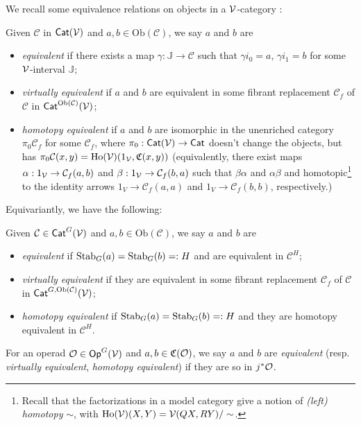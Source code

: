 \documentclass[psamsfonts,oneside,10pt,letterpaper
,draft
]{amsart}%
\renewcommand{\C}{\ensuremath{\mathfrak{C}}}
\newcommand{\J}{\ensuremath{\mathbb{J}}}
\renewcommand{\1}{\ensuremath{\mathbb{id}}}
\DeclareMathOperator{\Ho}{Ho}
\begin{document}
We recall some equivalence relations on objects in a $\mathcal V$-category \cite{Cav14, BM13}:
\begin{definition}
      Given $\mathcal{C}$ in  $\mathsf{Cat}(\mathcal V)$ and $a,b\in\mathrm{Ob}(\mathcal C)$, we say $a$ and $b$ are
      \begin{itemize}
      \item {\em equivalent} if there exists a map $\gamma: \J \to \mathcal C$ such that
            $\gamma i_0 = a$, $\gamma i_1 = b$
            for some $\mathcal V$-interval $\J$;
      \item {\em virtually equivalent} if $a$ and $b$ are equivalent in some fibrant replacement
            $\mathcal C_f$ of $\mathcal C$ in $\mathsf{Cat}^{\mathrm{Ob}(\mathcal C)}(\mathcal V)$;
      \item {\em homotopy equivalent} if $a$ and $b$ are isomorphic in the unenriched category $\pi_0 \mathcal C_f$
            for some $\mathcal C_f$,
            where $\pi_0: \mathsf{Cat}(\mathcal V) \to \mathsf{Cat}$ doesn't change the objects, but has $\pi_0\mathcal C(x,y) = \Ho(\V)(1_\V,\C(x,y))$
            (equivalently, there exist maps
            $\alpha: 1_{\mathcal V} \to \mathcal C_f(a,b)$ and $\beta: 1_{\mathcal V}\to \mathcal C_f(b,a)$ such that
            $\beta\alpha$ and $\alpha\beta$ and homotopic\footnote{
              Recall that the factorizations in a model category give a notion of \textit{(left) homotopy} $\sim$,
              with $\Ho(\V)(X,Y) = \V(QX,RY)/\sim$.}
            to the identity arrows
            $1_V\to \mathcal C_f(a,a)$ and $1_V \to \mathcal C_f(b,b)$, respectively.)
      \end{itemize}
\end{definition}

Equivariantly, we have the following:
\begin{definition}
      Given $\mathcal{C}\in \mathsf{Cat}^G(\mathcal V)$ and $a,b\in \mathrm{Ob}(\mathcal{C})$, we say $a$ and $b$ are
      \begin{itemize}
      \item {\em equivalent} if $\mathrm{Stab}_G(a) = \mathrm{Stab}_G(b) =: H$ and are equivalent in $\mathcal{C}^H$;
      \item {\em virtually equivalent} if they are equivalent in some fibrant replacement
            $\mathcal{C}_f$ of $\mathcal{C}$ in $\mathsf{Cat}^{G, \mathrm{Ob}(\mathcal C)}(\mathcal V)$;
      \item {\em homotopy equivalent} if $\mathrm{Stab}_G(a) = \mathrm{Stab}_G(b) =: H$ and they are homotopy equivalent in $\mathcal{C}^H$. 
      \end{itemize}
      For an operad $\mathcal{O}\in \mathsf{Op}^G(\mathcal V)$ and $a,b\in \C(\O)$, we say $a$ and $b$ are
      {\em equivalent} (resp. {\em virtually equivalent}, {\em homotopy equivalent}) if they are so in $j^*\mathcal{O}$. 
\end{definition}
\end{document}

